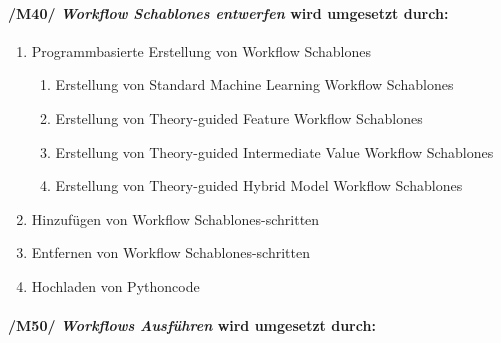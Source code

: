 \paragraph{/M40/ \textit{\glspl{Workflow Schablone} entwerfen} wird umgesetzt durch:}


\renewcommand{\labelenumi}{/FA\arabic{enumi}0/}
\renewcommand{\labelenumii}{/FA\arabic{enumi}\arabic{enumii}/}
\begin{enumerate}
    \setcounter{enumi}{\value{FAs}}
    \setlength\itemsep{-1em}
    \item Programmbasierte Erstellung von \glspl{Workflow Schablone}
    \vspace{-5mm}
    \begin{enumerate}
        \setlength\itemsep{-1em}
        \item Erstellung von Standard Machine Learning \glspl{Workflow Schablone} %
        \item Erstellung von Theory-guided Feature \glspl{Workflow Schablone} %
        \item Erstellung von Theory-guided Intermediate Value \glspl{Workflow Schablone} %
        \item Erstellung von Theory-guided Hybrid Model \glspl{Workflow Schablone} %
    \end{enumerate}
    \renewcommand{\labelenumi}{/FA\arabic{enumi}0/}
    \item Hinzufügen von \glspl{Workflow Schablone}-schritten
    \item Entfernen von \glspl{Workflow Schablone}-schritten
    \item Hochladen von \gls{Python}code%
    \setcounter{FAs}{\value{enumi}}
\end{enumerate}

\paragraph{/M50/ \textit{\glspl{Workflow} Ausführen} wird umgesetzt durch:}

